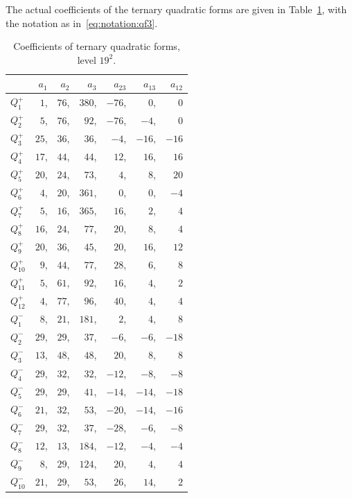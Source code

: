 The actual coefficients of the ternary quadratic forms are given in
Table~\ref{table:qf3:19}, with the notation
as in~\eqref{eq:notation:qf3}.
\begin{table}
\begin{tabular}{|l|rrrrrr|}
\hline
 & $a_1$ & $a_2$ & $a_3$ & $a_{23}$ & $a_{13}$ & $a_{12}$ \\
\hline\hline
$Q_{1}^{+}$ & $1$,&$76$,&$380$,&$-76$,&$0$,&$0$ \\
$Q_{2}^{+}$ & $5$,&$76$,&$92$,&$-76$,&$-4$,&$0$ \\
$Q_{3}^{+}$ & $25$,&$36$,&$36$,&$-4$,&$-16$,&$-16$ \\
$Q_{4}^{+}$ & $17$,&$44$,&$44$,&$12$,&$16$,&$16$ \\
$Q_{5}^{+}$ & $20$,&$24$,&$73$,&$4$,&$8$,&$20$ \\
$Q_{6}^{+}$ & $4$,&$20$,&$361$,&$0$,&$0$,&$-4$ \\
$Q_{7}^{+}$ & $5$,&$16$,&$365$,&$16$,&$2$,&$4$ \\
$Q_{8}^{+}$ & $16$,&$24$,&$77$,&$20$,&$8$,&$4$ \\
$Q_{9}^{+}$ & $20$,&$36$,&$45$,&$20$,&$16$,&$12$ \\
$Q_{10}^{+}$ & $9$,&$44$,&$77$,&$28$,&$6$,&$8$ \\
$Q_{11}^{+}$ & $5$,&$61$,&$92$,&$16$,&$4$,&$2$ \\
$Q_{12}^{+}$ & $4$,&$77$,&$96$,&$40$,&$4$,&$4$ \\
\hline
$Q_{1}^{-}$ & $8$,&$21$,&$181$,&$2$,&$4$,&$8$ \\
$Q_{2}^{-}$ & $29$,&$29$,&$37$,&$-6$,&$-6$,&$-18$ \\
$Q_{3}^{-}$ & $13$,&$48$,&$48$,&$20$,&$8$,&$8$ \\
$Q_{4}^{-}$ & $29$,&$32$,&$32$,&$-12$,&$-8$,&$-8$ \\
$Q_{5}^{-}$ & $29$,&$29$,&$41$,&$-14$,&$-14$,&$-18$ \\
$Q_{6}^{-}$ & $21$,&$32$,&$53$,&$-20$,&$-14$,&$-16$ \\
$Q_{7}^{-}$ & $29$,&$32$,&$37$,&$-28$,&$-6$,&$-8$ \\
$Q_{8}^{-}$ & $12$,&$13$,&$184$,&$-12$,&$-4$,&$-4$ \\
$Q_{9}^{-}$ & $8$,&$29$,&$124$,&$20$,&$4$,&$4$ \\
$Q_{10}^{-}$ & $21$,&$29$,&$53$,&$26$,&$14$,&$2$ \\
\hline
\end{tabular}
\caption{Coefficients of ternary quadratic forms, level $19^2$.
          \label{table:qf3:19}}
\end{table}
